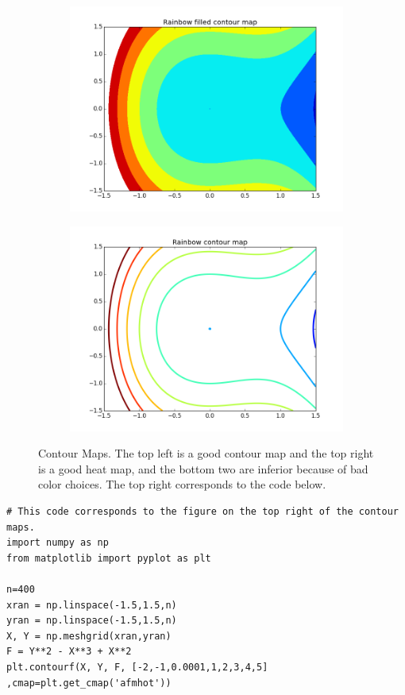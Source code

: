 \begin{figure}[h]
\begin{subfigure}{.45\textwidth}
\includegraphics[width=\textwidth]{contour_map_rainbow_filled.png}
\end{subfigure}
\begin{subfigure}{.45\textwidth}
\centering
\includegraphics[width=\textwidth]{contour_map_rainbow.png}
\end{subfigure}
\caption{Contour Maps.  The top left is a good contour map and the top right is a good heat map, and the bottom two are inferior because of bad color choices.  The top right corresponds to the code below.}
\label{fig:contour}
\end{figure}

\begin{lstlisting}
# This code corresponds to the figure on the top right of the contour maps.
import numpy as np
from matplotlib import pyplot as plt

n=400
xran = np.linspace(-1.5,1.5,n)
yran = np.linspace(-1.5,1.5,n)
X, Y = np.meshgrid(xran,yran)
F = Y**2 - X**3 + X**2
plt.contourf(X, Y, F, [-2,-1,0.0001,1,2,3,4,5] ,cmap=plt.get_cmap('afmhot'))
\end{lstlisting}


